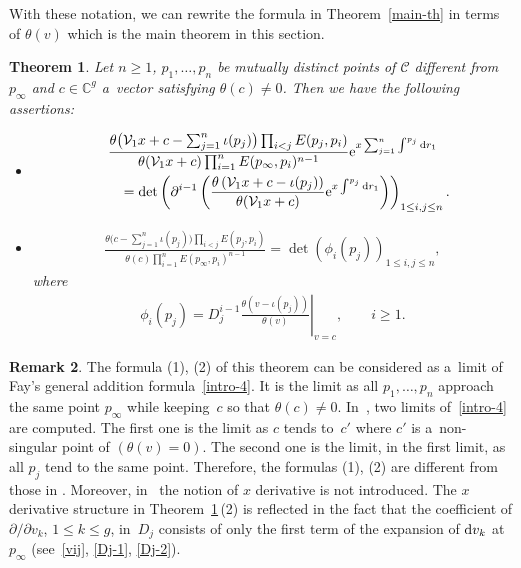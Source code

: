 \documentclass[10pt,a4paper]{amsart}
\numberwithin{equation}{section}
\newtheorem{Theorem}{Theorem}[section]
\theoremstyle{definition}
\newtheorem{Remark}[Theorem]{Remark}
\begin{document}
With these notation, we can rewrite the formula in Theorem~\ref{main-th}
 in terms of $\theta(v)$ which is the main theorem in this section.


\begin{Theorem}\label{addition-th}
Let $n\geq 1$, $p_1,\dots ,p_n$ be mutually distinct points of ${\mathcal C}$ different
from $p_\infty$ and $c\in {\mathbb C}^g$ a~vector satisfying $\theta(c)\neq0$. Then we have the following assertions:
\begin{itemize}\itemsep=0pt
\item[$(1)$]
\begin{gather*}
\frac{\theta\bigl({\mathcal V}_1x+c-\sum_{j=1}^n \iota(p_j)\bigr)\prod_{i<j}E(p_j,p_i)}
{\theta({\mathcal V}_1x+c)\prod_{i=1}^n E(p_\infty,p_i)^{n-1}}
{\rm e}^{x\sum_{j=1}^n\int^{p_j}{\rm d}r_1}\\
\qquad
=\det\left(\partial^{i-1}\left(
\frac{\theta\left({\mathcal V}_1x+c-\iota(p_j)\right)}{\theta({\mathcal V}_1x+c)}
{\rm e}^{x\int^{p_j}{\rm d}r_1}\right)\right)_{1\leq i,j\leq n}.
\end{gather*}


\item[$(2)$]
\begin{gather*}
\frac{\theta\bigl(c-\sum_{j=1}^n \iota(p_j)\bigr)\prod_{i<j}E(p_j,p_i)}
{\theta(c)\prod_{i=1}^n E(p_\infty,p_i)^{n-1}}=
\det\left(
\phi_i(p_j)
\right)_{1\leq i,j\leq n},
\end{gather*}
where
\begin{gather*}
\phi_i(p_j)=\left.D_j^{i-1}\frac{\theta\left(v-\iota(p_j)\right)}{\theta(v)}\right|_{v=c},
\qquad
i\geq 1.
\end{gather*}
\end{itemize}
\end{Theorem}


\begin{Remark}
The formula (1), (2) of this theorem
can be considered as a~limit of
Fay's general addition formula~\eqref{intro-4}.
It is the limit as all $p_1,\dots ,p_n$ approach the same point $p_\infty$ while
keeping~$c$ so that $\theta(c)\neq 0$.
In~\cite{Fay1973}, two limits of~\eqref{intro-4} are computed.
The first one is the limit as $c$ tends to~$c'$ where $c'$ is a~non-singular point of
$(\theta(v)=0)$.
The second one is the limit, in the first limit, as all $p_j$ tend to the same point.
Therefore, the formulas (1), (2) are different from those in \cite[Corollary~2.19]{Fay1973}.
 Moreover, in~\cite{Fay1973} the notion of $x$ derivative is not introduced.
 The $x$ derivative structure in Theorem~\ref{addition-th}\,(2) is reflected in the fact
 that the coefficient of $\partial/\partial v_k$, $1\leq k\leq g$, in~$D_j$ consists of
 only the first term of the expansion of ${\rm d}v_k$ at $p_\infty$ (see~\eqref{vij}, \eqref{Dj-1}, \eqref{Dj-2}).
 \end{Remark}
\end{document}
